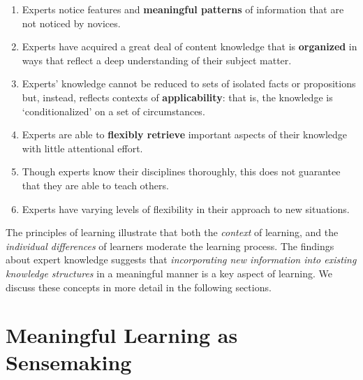 \documentclass[letterpaper, nobind]{templates/ociamthesis}
\begin{document}
\begin{enumerate}
\def\labelenumi{\arabic{enumi}.}
\item
  Experts notice features and \textbf{meaningful patterns} of information
  that are not noticed by novices.
\item
  Experts have acquired a great deal of content knowledge that is
  \textbf{organized} in ways that reflect a deep understanding of their
  subject matter.
\item
  Experts' knowledge cannot be reduced to sets of isolated facts or
  propositions but, instead, reflects contexts of \textbf{applicability}:
  that is, the knowledge is `conditionalized' on a set of
  circumstances.
\item
  Experts are able to \textbf{flexibly retrieve} important aspects of their
  knowledge with little attentional effort.
\item
  Though experts know their disciplines thoroughly, this does not
  guarantee that they are able to teach others.
\item
  Experts have varying levels of flexibility in their approach to new
  situations.
\end{enumerate}

The principles of learning illustrate that both the \emph{context} of
learning, and the \emph{individual differences} of learners moderate the
learning process. The findings about expert knowledge suggests that
\emph{incorporating new information into existing knowledge structures} in a
meaningful manner is a key aspect of learning. We discuss these concepts
in more detail in the following sections.

\hypertarget{sec-bg-learn-sensemaking}{%
\section{Meaningful Learning as Sensemaking}\label{sec-bg-learn-sensemaking}}
\end{document}
